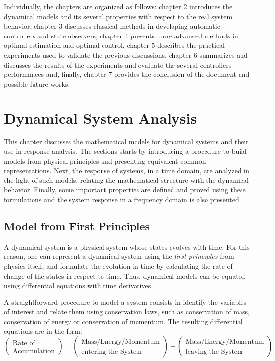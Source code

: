 \documentclass[a4paper,11pt]{book}
\numberwithin{figure}{chapter}
\numberwithin{equation}{chapter}
\numberwithin{table}{chapter}
\theoremstyle{definition}
\begin{document}
Individually, the chapters are organized as follows: chapter 2 introduces the dynamical models and its several properties with respect to the real system behavior, chapter 3 discusses classical methods in developing automatic controllers and state observers, chapter 4 presents more advanced methods in optimal estimation and optimal control, chapter 5 describes the practical experiments used to validate the previous discussions, chapter 6 summarizes and discusses the results of the experiments and evaluate the several controllers performances and, finally, chapter 7 provides the conclusion of the document and possible future works.

\clearpage
\chapter{Dynamical System Analysis}

This chapter discusses the mathematical models for dynamical systems and their use in response analysis. The sections starts by introducing a procedure to build models from physical principles and presenting equivalent common representations. Next, the response of systems, in a time domain, are analyzed in the light of such models, relating the mathematical structure with the dynamical behavior. Finally, some important properties are defined and proved using these formulations and the system response in a frequency domain is also presented.

\section{Model from First Principles}

A dynamical system is a physical system whose states evolves with time. For this reason, one can represent a dynamical system using the \textit{first principles} from physics itself, and formulate the evolution in time by calculating the rate of change of the states in respect to time. Thus, dynamical models can be equated using differential equations with time derivatives. 

A straightforward procedure to model a system consists in identify the variables of interest and relate them using conservation laws, such as conservation of mass, conservation of energy or conservation of momentum. The resulting differential equations are in the form:
\begin{equation} \label{eq:massCons01}
	\begin{pmatrix}
		\text{Rate of} \\ \text{Accumulation}
	\end{pmatrix} = \begin{pmatrix}
		\text{Mass/Energy/Momentum} \\ \text{entering the System}
	\end{pmatrix} - \begin{pmatrix}
		\text{Mass/Energy/Momentum} \\ \text{leaving the System}
	\end{pmatrix}
\end{equation}
\end{document}
